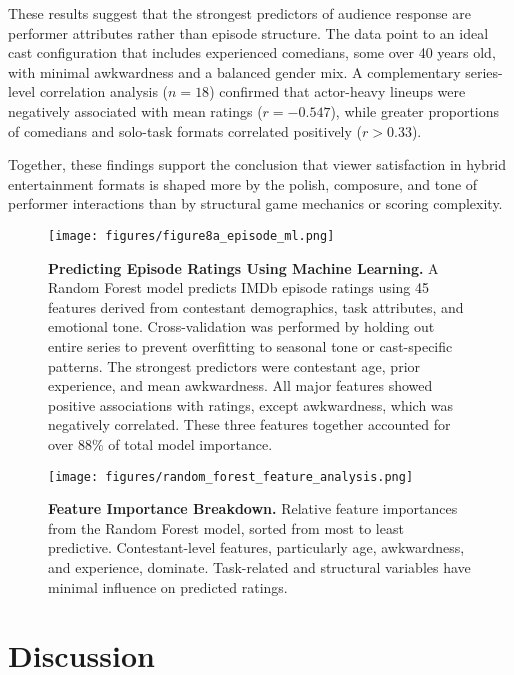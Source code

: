 \documentclass[10pt,letterpaper]{article}
\begin{document}
These results suggest that the strongest predictors of audience response are performer attributes rather than episode structure. The data point to an ideal cast configuration that includes experienced comedians, some over 40 years old, with minimal awkwardness and a balanced gender mix. A complementary series-level correlation analysis ($n = 18$) confirmed that actor-heavy lineups were negatively associated with mean ratings ($r = -0.547$), while greater proportions of comedians and solo-task formats correlated positively ($r > 0.33$).

Together, these findings support the conclusion that viewer satisfaction in hybrid entertainment formats is shaped more by the polish, composure, and tone of performer interactions than by structural game mechanics or scoring complexity.

\begin{figure}[!h]
\centering
\texttt{[image: figures/figure8a\_episode\_ml.png]}
\caption{{\bf Predicting Episode Ratings Using Machine Learning.}
A Random Forest model predicts IMDb episode ratings using 45 features derived from contestant demographics, task attributes, and emotional tone. Cross-validation was performed by holding out entire series to prevent overfitting to seasonal tone or cast-specific patterns. The strongest predictors were contestant age, prior experience, and mean awkwardness. All major features showed positive associations with ratings, except awkwardness, which was negatively correlated. These three features together accounted for over 88\% of total model importance.}
\label{fig:ml_prediction}
\end{figure}
\FloatBarrier

\begin{figure}[!h]
\centering
\texttt{[image: figures/random\_forest\_feature\_analysis.png]}
\caption{{\bf Feature Importance Breakdown.}
Relative feature importances from the Random Forest model, sorted from most to least predictive. Contestant-level features, particularly age, awkwardness, and experience, dominate. Task-related and structural variables have minimal influence on predicted ratings.}
\label{fig:feature_importance}
\end{figure}
\FloatBarrier





\section*{Discussion}
\end{document}
